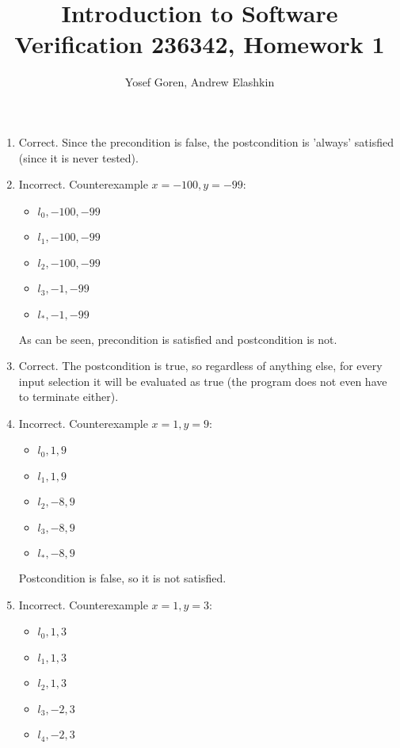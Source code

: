 \documentclass{article}
\begin{document}
\author{Yosef Goren, Andrew Elashkin}
\title{Introduction to Software Verification 236342, Homework 1}
\maketitle
\section{}
\begin{enumerate}[label=\Alph*.]
    \item Correct. Since the precondition is false, the postcondition is 'always' satisfied (since it is never tested).
    \item Incorrect. Counterexample $x=-100,y=-99$:
    \begin{itemize}
        \item $l_0, -100, -99$
        \item $l_1, -100, -99$
        \item $l_2, -100, -99$
        \item $l_3, -1, -99$
        \item $l_*, -1, -99$
    \end{itemize}
    As can be seen, precondition is satisfied and postcondition is not.
    \item Correct. The postcondition is true, so regardless of anything else,
    for every input selection it will be evaluated as true (the program does not even have to terminate either).
    \item Incorrect. Counterexample $x=1, y=9$:
    \begin{itemize}
        \item $l_0, 1, 9$
        \item $l_1, 1, 9$
        \item $l_2, -8, 9$
        \item $l_3, -8, 9$
        \item $l_*, -8, 9$
    \end{itemize}
    Postcondition is false, so it is not satisfied.
    \item Incorrect. Counterexample $x=1, y=3$:
    \begin{itemize}
        \item $l_0, 1, 3$
        \item $l_1, 1, 3$
        \item $l_2, 1, 3$
        \item $l_3, -2, 3$
        \item $l_4, -2, 3$

\end{itemize}
\end{enumerate}
\end{document}
